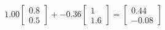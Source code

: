 \documentclass[preview]{standalone}
\begin{document}
\begin{align*}
1.00 \begin{bmatrix} 0.8 \\ 0.5 \end{bmatrix} + -0.36 \begin{bmatrix} 1 \\ 1.6 \end{bmatrix} = \begin{bmatrix} 0.44 \\ -0.08 \end{bmatrix}
\end{align*}
\end{document}
